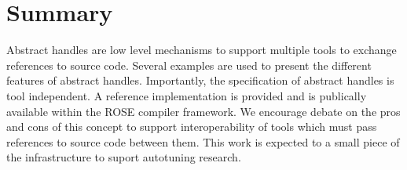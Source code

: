 \section{Summary}

   Abstract handles are low level mechanisms to support multiple tools
to exchange references to source code.  Several examples are used to
present the different features of abstract handles.  Importantly, the 
specification of abstract handles is tool independent.  A reference
implementation is provided and is publically available within the
ROSE compiler framework.  We encourage debate on the pros and cons
of this concept to support interoperability of tools which must
pass references to source code between them.  This work is expected
to a small piece of the infrastructure to suport autotuning research.


